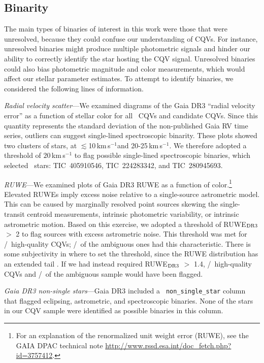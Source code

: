 \documentclass[11pt,twocolumn,tighten]{aastex63}
\newcommand{\kms}{{km\,s$^{-1}$}}
\begin{document}
\subsection{Binarity}
\label{subsec:binarity}

The main types of binaries of interest in this work were those that
were unresolved, because they could confuse our understanding of CQVs.
For instance, unresolved binaries might produce multiple photometric
signals and hinder our ability to correctly identify the star hosting
the CQV signal.  Unresolved binaries could also bias photometric magnitude
and color measurements, which would affect our stellar parameter
estimates.  To attempt to identify binaries, we considered the
following lines of information.

{\it Radial velocity scatter}---We examined diagrams of the Gaia DR3
``radial velocity error'' as a function of stellar color for all
\ncqvsnodebunked\ CQVs and candidate CQVs.  Since this quantity
represents the standard deviation of the non-published Gaia RV time
series, outliers can suggest single-lined spectroscopic binarity.
These plots showed two clusters of stars, at $\lesssim$10\,\kms and
20-25\,\kms.  We therefore adopted a threshold of $20$\,km\,s$^{-1}$ to
flag possible single-lined spectroscopic binaries, which selected
\nrvscatterflag\ stars: TIC~405910546, TIC~224283342, and
TIC~280945693.

{\it RUWE}---We examined plots of Gaia DR3 RUWE as a function of
color.\footnote{For an explanation of the renormalized unit weight
error (RUWE), see the GAIA DPAC technical note
\url{http://www.rssd.esa.int/doc_fetch.php?  id=3757412}.}  Elevated
RUWEs imply excess noise relative to a single-source astrometric
model.  This can be caused by marginally resolved point sources
skewing the single-transit centroid measurements,  intrinsic
photometric variability, or intrinsic astrometric motion.  Based on
this exercise, we adopted a threshold of RUWE$_{\rm DR3}$ $>$ 2 to
flag sources with excess astrometric noise.  This threshold was met
for \ngoodhighruwe/\ngoods\ high-quality CQVs;
\nmaybehighruwe/\nmaybes\ of the ambiguous ones had this
characteristic.  There is some subjectivity in where to set the
threshold, since the RUWE distribution has an extended tail
\citep[e.g.][]{2022MNRAS.513.5270P}.  If we had instead required
RUWE$_{\rm DR3}$ $>$ 1.4, \ngoodweakruwe/\ngoods\ high-quality CQVs
and \nmaybeweakruwe/\nmaybes\ of the ambiguous sample would have been
flagged.

{\it Gaia DR3 non-single stars}---Gaia DR3 included a {\tt
non\_single\_star} column that flagged eclipsing, astrometric, and
spectroscopic binaries.  None of the stars in our CQV sample were
identified as possible binaries in this column.
\end{document}
